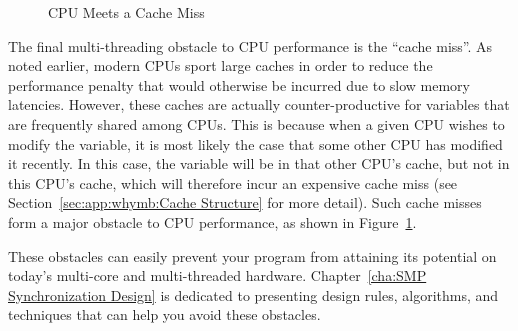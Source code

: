 \begin{figure}[htb]
\begin{center}
\end{center}
\caption{CPU Meets a Cache Miss}
\label{fig:cpu:CPU Meets a Cache Miss}
\end{figure}

The final multi-threading obstacle to CPU performance is the ``cache miss''.
As noted earlier, modern CPUs sport large caches in order to reduce the
performance penalty that would otherwise be incurred due to slow memory
latencies.
However, these caches are actually counter-productive for variables that
are frequently shared among CPUs.
This is because when a given CPU wishes to modify the variable, it is
most likely the case that some other CPU has modified it recently.
In this case, the variable will be in that other CPU's cache, but not
in this CPU's cache, which will therefore incur an expensive cache miss
(see Section~\ref{sec:app:whymb:Cache Structure} for more detail).
Such cache misses form a major obstacle to CPU performance, as shown
in Figure~\ref{fig:cpu:CPU Meets a Cache Miss}.


These obstacles can easily prevent your program from attaining its
potential on today's multi-core and multi-threaded hardware.
Chapter~\ref{cha:SMP Synchronization Design}
is dedicated to presenting
design rules, algorithms, and techniques that can help you
avoid these obstacles.
